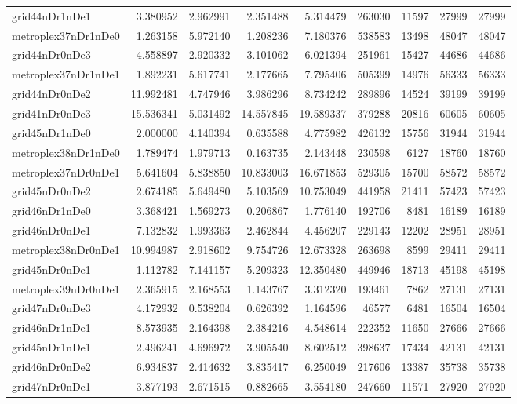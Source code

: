 \begin{longtable}{|l|r|r|r|r|r|r|r|r|}
grid44nDr1nDe1 & 3.380952 & 2.962991 & 2.351488 & 5.314479 & 263030 & 11597 & 27999 & 27999 \\
metroplex37nDr1nDe0 & 1.263158 & 5.972140 & 1.208236 & 7.180376 & 538583 & 13498 & 48047 & 48047 \\
grid44nDr0nDe3 & 4.558897 & 2.920332 & 3.101062 & 6.021394 & 251961 & 15427 & 44686 & 44686 \\
metroplex37nDr1nDe1 & 1.892231 & 5.617741 & 2.177665 & 7.795406 & 505399 & 14976 & 56333 & 56333 \\
grid44nDr0nDe2 & 11.992481 & 4.747946 & 3.986296 & 8.734242 & 289896 & 14524 & 39199 & 39199 \\
grid41nDr0nDe3 & 15.536341 & 5.031492 & 14.557845 & 19.589337 & 379288 & 20816 & 60605 & 60605 \\
grid45nDr1nDe0 & 2.000000 & 4.140394 & 0.635588 & 4.775982 & 426132 & 15756 & 31944 & 31944 \\
metroplex38nDr1nDe0 & 1.789474 & 1.979713 & 0.163735 & 2.143448 & 230598 & 6127 & 18760 & 18760 \\
metroplex37nDr0nDe1 & 5.641604 & 5.838850 & 10.833003 & 16.671853 & 529305 & 15700 & 58572 & 58572 \\
grid45nDr0nDe2 & 2.674185 & 5.649480 & 5.103569 & 10.753049 & 441958 & 21411 & 57423 & 57423 \\
grid46nDr1nDe0 & 3.368421 & 1.569273 & 0.206867 & 1.776140 & 192706 & 8481 & 16189 & 16189 \\
grid46nDr0nDe1 & 7.132832 & 1.993363 & 2.462844 & 4.456207 & 229143 & 12202 & 28951 & 28951 \\
metroplex38nDr0nDe1 & 10.994987 & 2.918602 & 9.754726 & 12.673328 & 263698 & 8599 & 29411 & 29411 \\
grid45nDr0nDe1 & 1.112782 & 7.141157 & 5.209323 & 12.350480 & 449946 & 18713 & 45198 & 45198 \\
metroplex39nDr0nDe1 & 2.365915 & 2.168553 & 1.143767 & 3.312320 & 193461 & 7862 & 27131 & 27131 \\
grid47nDr0nDe3 & 4.172932 & 0.538204 & 0.626392 & 1.164596 & 46577 & 6481 & 16504 & 16504 \\
grid46nDr1nDe1 & 8.573935 & 2.164398 & 2.384216 & 4.548614 & 222352 & 11650 & 27666 & 27666 \\
grid45nDr1nDe1 & 2.496241 & 4.696972 & 3.905540 & 8.602512 & 398637 & 17434 & 42131 & 42131 \\
grid46nDr0nDe2 & 6.934837 & 2.414632 & 3.835417 & 6.250049 & 217606 & 13387 & 35738 & 35738 \\
grid47nDr0nDe1 & 3.877193 & 2.671515 & 0.882665 & 3.554180 & 247660 & 11571 & 27920 & 27920 \\

\end{longtable}
